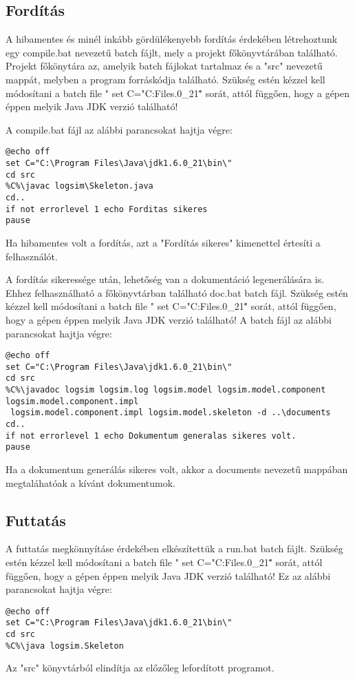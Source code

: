 \subsection{Fordítás}
A hibamentes és minél inkább gördülékenyebb fordítás érdekében létrehoztunk egy compile.bat nevezetű batch fájlt, mely a projekt főkönyvtárában található. Projekt főkönytára az, amelyik batch fájlokat tartalmaz és a "src" nevezetű mappát, melyben a program forráskódja található. Szükség estén kézzel kell módosítani a batch file " set C="C:\Program Files\Java{}.0_21\bin\" " sorát, attól függően, hogy a gépen éppen melyik Java JDK verzió található!

A compile.bat fájl az alábbi parancsokat hajtja végre:
\lstset{escapeinside=`', xleftmargin=10pt, frame=single, basicstyle=\ttfamily\footnotesize, language=sh}
\begin{lstlisting}
@echo off
set C="C:\Program Files\Java\jdk1.6.0_21\bin\"
cd src
%C%\javac logsim\Skeleton.java
cd..
if not errorlevel 1 echo Forditas sikeres
pause
\end{lstlisting}
Ha hibamentes volt a fordítás, azt a "Fordítás sikeres" kimenettel értesíti a felhasználót.



A fordítás sikeressége után, lehetőség van a dokumentáció legenerálására is. Ehhez felhasználható a főkönyvtárban található doc.bat batch fájl.
Szükség estén kézzel kell módosítani a batch file " set C="C:\Program Files\Java{}.0_21\bin\" " sorát, attól függően, hogy a gépen éppen melyik Java JDK verzió található!
A batch fájl az alábbi parancsokat hajtja végre:
\lstset{escapeinside=`', xleftmargin=10pt, frame=single, basicstyle=\ttfamily\footnotesize, language=sh}
\begin{lstlisting}
@echo off
set C="C:\Program Files\Java\jdk1.6.0_21\bin\"
cd src
%C%\javadoc logsim logsim.log logsim.model logsim.model.component logsim.model.component.impl 
 logsim.model.component.impl logsim.model.skeleton -d ..\documents
cd..
if not errorlevel 1 echo Dokumentum generalas sikeres volt. 
pause
\end{lstlisting}
Ha a dokumentum generálás sikeres volt, akkor a documents nevezetű mappában megtaláhatóak a kívánt dokumentumok.




\subsection{Futtatás}
A futtatás megkönnyításe érdekében elkészítettük a run.bat batch fájlt.
Szükség estén kézzel kell módosítani a batch file " set C="C:\Program Files\Java{}.0_21\bin\" " sorát, attól függően, hogy a gépen éppen melyik Java JDK verzió található!
Ez az alábbi parancsokat hajtja végre:
\lstset{escapeinside=`', xleftmargin=10pt, frame=single, basicstyle=\ttfamily\footnotesize, language=sh}
\begin{lstlisting}
@echo off
set C="C:\Program Files\Java\jdk1.6.0_21\bin\"
cd src
%C%\java logsim.Skeleton
\end{lstlisting}
Az "src" könyvtárból elindítja az előzőleg lefordított programot.


